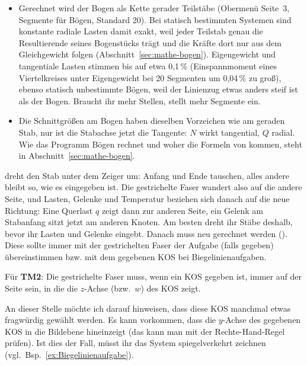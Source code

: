\begin{itemize}
        Bogen der \textbf{Winkel ab Stabanfang im Winkelmodus des Rechners}, also dasselbe wie $p$
        bei . Eine radiale Last $2\cos\varphi$ gebt ihr als  ein,
        das stimmt in DEG und RAD. Ein Polynom wie  hängt dagegen vom Modus ab (DEG:
        $x$ von 0 bis 90). Mit Bögen nur Zahlen, ein Symbol wie  schaltet den symbolischen
        Modus ein, und der kann keine Bögen.
  \item Gerechnet wird der Bogen als Kette gerader Teilstäbe (Obermenü Seite~3, Segmente für
        Bögen, Standard 20). Bei statisch bestimmten Systemen sind konstante radiale Lasten damit
        exakt, weil jeder Teilstab genau die Resultierende seines Bogenstücks trägt und die Kräfte
        dort nur aus dem Gleichgewicht folgen (Abschnitt~\ref{sec:mathe-bogen}). Eigengewicht und
        tangentiale Lasten stimmen bis auf etwa 0,1\,\% (Einspannmoment eines Viertelkreises unter
        Eigengewicht bei 20 Segmenten um 0,04\,\% zu groß), ebenso statisch unbestimmte Bögen, weil der
        Linienzug etwas anders steif ist als der Bogen. Braucht ihr mehr Stellen, stellt mehr Segmente
        ein.
  \item Die Schnittgrößen am Bogen haben dieselben Vorzeichen wie am geraden Stab, nur ist die
        Stabachse jetzt die Tangente: $N$ wirkt tangential, $Q$ radial. Wie das Programm Bögen
        rechnet und woher die Formeln von  kommen, steht in
        Abschnitt~\ref{sec:mathe-bogen}.
\end{itemize}

 dreht den Stab unter dem Zeiger um: Anfang und Ende tauschen, alles andere bleibt so, wie
es eingegeben ist. Die gestrichelte Faser wandert also auf die andere Seite, und Lasten, Gelenke und
Temperatur beziehen sich danach auf die neue Richtung: Eine Querlast $q$ zeigt dann zur anderen
Seite, ein Gelenk am Stabanfang sitzt jetzt am anderen Knoten. Am besten dreht ihr Stäbe deshalb,
bevor ihr Lasten und Gelenke eingebt. Danach muss neu gerechnet werden ().
Diese sollte immer mit der gestrichelten Faser der Aufgabe (falls gegeben) übereinstimmen
bzw. mit dem gegebenen KOS bei Biegelinienaufgaben.

Für \textbf{TM2}: Die gestrichelte Faser muss, wenn ein KOS gegeben ist, immer auf der Seite sein, in die die $z$-Achse (bzw.\ $w$) des KOS zeigt.

An dieser Stelle möchte ich darauf hinweisen, dass diese KOS manchmal etwas fragwürdig gewählt werden.
Es kann vorkommen, dass die $y$-Achse des gegebenen KOS in die Bildebene hineinzeigt (das kann man mit der Rechte-Hand-Regel prüfen).
Ist dies der Fall, müsst ihr das System spiegelverkehrt zeichnen (vgl.\ Bsp.~\ref{ex:Biegelinienaufgabe}).

